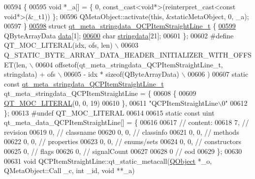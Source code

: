 \begin{DoxyCode}
00594 \{
00595     \textcolor{keywordtype}{void} *\_a[] = \{ 0, \textcolor{keyword}{const\_cast<}\textcolor{keywordtype}{void}*\textcolor{keyword}{>}(\textcolor{keyword}{reinterpret\_cast<}\textcolor{keyword}{const }\textcolor{keywordtype}{void}*\textcolor{keyword}{>}(&\_t1)) \};
00596     QMetaObject::activate(\textcolor{keyword}{this}, &staticMetaObject, 0, \_a);
00597 \}
\hypertarget{a00067_source_l00598}{}\hyperlink{a00067}{00598} \textcolor{keyword}{struct }\hyperlink{a00067_d1/d72/a00204}{qt\_meta\_stringdata\_QCPItemStraightLine\_t} \{
\hypertarget{a00067_source_l00599}{}\hyperlink{a00067_a86cfd75cdbd69fb7bac81f44368368a2}{00599}     QByteArrayData \hyperlink{a00067_a86cfd75cdbd69fb7bac81f44368368a2}{data}[1];
\hypertarget{a00067_source_l00600}{}\hyperlink{a00067_a4fcd4918ec3f5999a6ee9ce08ebcdb96}{00600}     \textcolor{keywordtype}{char} \hyperlink{a00067_a4fcd4918ec3f5999a6ee9ce08ebcdb96}{stringdata}[21];
00601 \};
00602 \textcolor{preprocessor}{#define QT\_MOC\_LITERAL(idx, ofs, len) \(\backslash\)}
00603 \textcolor{preprocessor}{    Q\_STATIC\_BYTE\_ARRAY\_DATA\_HEADER\_INITIALIZER\_WITH\_OFFSET(len, \(\backslash\)}
00604 \textcolor{preprocessor}{    offsetof(qt\_meta\_stringdata\_QCPItemStraightLine\_t, stringdata) + ofs \(\backslash\)}
00605 \textcolor{preprocessor}{        - idx * sizeof(QByteArrayData) \(\backslash\)}
00606 \textcolor{preprocessor}{    )}
00607 \textcolor{keyword}{static} \textcolor{keyword}{const} \hyperlink{a00067_d1/d72/a00204}{qt\_meta\_stringdata\_QCPItemStraightLine\_t} 
      qt\_meta\_stringdata\_QCPItemStraightLine = \{
00608     \{
00609 \hyperlink{a00067_a75bb9482d242cde0a06c9dbdc6b83abe}{QT\_MOC\_LITERAL}(0, 0, 19)
00610     \},
00611     \textcolor{stringliteral}{"QCPItemStraightLine\(\backslash\)0"}
00612 \};
00613 \textcolor{preprocessor}{#undef QT\_MOC\_LITERAL}
00614 
00615 \textcolor{keyword}{static} \textcolor{keyword}{const} uint qt\_meta\_data\_QCPItemStraightLine[] = \{
00616 
00617  \textcolor{comment}{// content:}
00618        7,       \textcolor{comment}{// revision}
00619        0,       \textcolor{comment}{// classname}
00620        0,    0, \textcolor{comment}{// classinfo}
00621        0,    0, \textcolor{comment}{// methods}
00622        0,    0, \textcolor{comment}{// properties}
00623        0,    0, \textcolor{comment}{// enums/sets}
00624        0,    0, \textcolor{comment}{// constructors}
00625        0,       \textcolor{comment}{// flags}
00626        0,       \textcolor{comment}{// signalCount}
00627 
00628        0        \textcolor{comment}{// eod}
00629 \};
00630 
00631 \textcolor{keywordtype}{void} QCPItemStraightLine::qt\_static\_metacall(\hyperlink{a00059}{QObject} *\_o, QMetaObject::Call \_c, \textcolor{keywordtype}{int} \_id, \textcolor{keywordtype}{void} **\_a)

\end{DoxyCode}
